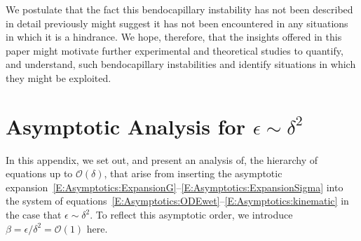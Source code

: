 \documentclass{jfm}
\newcommand{\order}[1]{\mathcal{O}\left(#1\right)}
\begin{document}
We postulate that the fact this bendocapillary instability has not been described in detail previously might suggest it has not been encountered in any situations in which it is a hindrance. We hope, therefore, that the insights offered in this paper might motivate further experimental and theoretical studies to quantify, and understand, such bendocapillary instabilities and identify situations in which they might be exploited. 



\appendix
\section{Asymptotic Analysis for $\epsilon \sim \delta^2$}\label{A:SmallDeformationAsymptotics}
In this appendix, we set out, and present an analysis of, the hierarchy of equations up to $\order{\delta}$, that arise from inserting the asymptotic expansion~\eqref{E:Asymptotics:ExpansionG}--\eqref{E:Asymptotics:ExpansionSigma} into the system of equations~\eqref{E:Asymptotics:ODEwet}--\eqref{E:Asymptotics:kinematic} in the case that $\epsilon \sim \delta^2$. To reflect this asymptotic order, we introduce $\beta = \epsilon / \delta^2 = \order{1}$ here.
\end{document}
